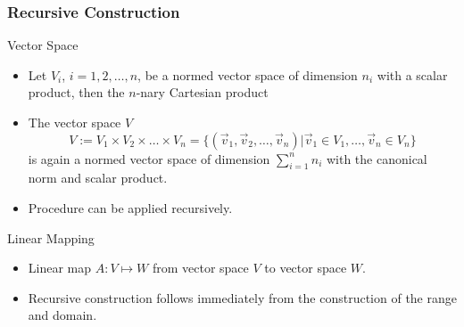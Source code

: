 \begin{frame}\frametitle{Recursive Construction}
  \begin{block}{Vector Space}
      \begin{itemize}
      \item Let $V_i$, $i=1, 2, \ldots,  n$, be a normed vector space of dimension
        $n_i$ with a
        scalar product, then the $n$-nary Cartesian product
      \item The vector space $V$
        \begin{equation*}
          V :=  V_1\times V_2 \times \ldots \times V_n = \{(\vec v_1, \vec v_2,
          \ldots, \vec v_n) | \vec v_1 \in V_1,
          \ldots, \vec v_n \in V_n\}
        \end{equation*}
        is again a normed vector space of dimension $\sum_{i=1}^n n_i$
        with the canonical norm and scalar product.
      \item Procedure can be applied recursively.
      \end{itemize}
  \end{block}\pause
  \begin{block}{Linear Mapping}
    \begin{itemize}
    \item  Linear map $A: V \mapsto
W$ from vector space $V$ to vector space $W$.
    \item Recursive construction follows immediately from the construction
    of the range and domain.
    \end{itemize}
  \end{block}
\end{frame}

